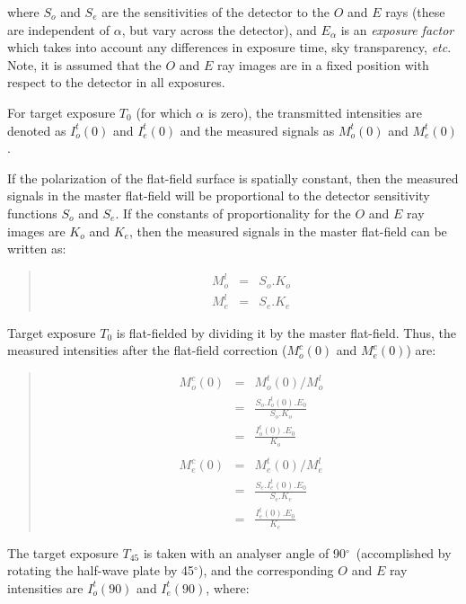 \documentclass[twoside,11pt]{starlink}
\newenvironment{myquote}{\begin{quote}\begin{small}}{\end{small}\end{quote}}
\providecommand{\dgs}{\hbox{$^\circ$}}
\begin{document}
where $S_{o}$ and $S_{e}$ are the sensitivities of the detector to the $O$
and $E$ rays (these are independent of $\alpha$, but vary across the
detector), and $E_{\alpha}$ is an \emph{exposure factor} which takes into
account any differences in exposure time, sky transparency, \emph{etc}. Note, it
is assumed that the $O$ and $E$ ray images are in a fixed position
with respect to the detector in all exposures.

For target exposure $T_{0}$ (for which $\alpha$ is zero), the transmitted
intensities are denoted as $I^{t}_{o}(0)$ and $I^{t}_{e}(0)$ and the
measured signals as $M^{t}_{o}(0)$ and $M^{t}_{e}(0)$.

If the polarization of the flat-field surface is spatially constant, then
the measured signals in the master flat-field will be proportional to
the detector sensitivity functions $S_{o}$ and $S_{e}$. If the constants
of proportionality for the $O$ and $E$ ray images are $K_{o}$ and
$K_{e}$, then the measured signals in the master flat-field can be
written as:

\begin{myquote}
\begin{eqnarray*}
  M^l_{o} & = & S_{o}.K_{o} \\
  M^l_{e} & = & S_{e}.K_{e}
\end{eqnarray*}
\end{myquote}

Target exposure $T_{0}$ is flat-fielded by dividing it by the master
flat-field. Thus, the measured intensities after the flat-field correction
($M^{c}_{o}(0)$ and $M^{c}_{e}(0)$) are:

\begin{myquote}
\begin{eqnarray*}
  M^{c}_{o}(0) & = & M^{t}_{o}(0) / M^{l}_{o} \\
                    & = & \frac{ S_{o}.I^{t}_{o}(0).E_{0} }{ S_{o}.K_{o} } \\
                    & = & \frac{ I^{t}_{o}(0).E_{0} }{ K_{o} } \\ \\
  M^{c}_{e}(0) & = & M^{t}_{e}(0) / M^{l}_{e} \\
                    & = & \frac{ S_{e}.I^{t}_{e}(0).E_{0} }{ S_{e}.K_{e} } \\
                    & = & \frac{ I^{t}_{e}(0).E_{0} }{ K_{e} }
\end{eqnarray*}
\end{myquote}

The target exposure $T_{45}$ is taken with an analyser angle of 90\dgs\
(accomplished by rotating the half-wave plate by 45\dgs), and the
corresponding $O$ and $E$ ray intensities are $I^{t}_{o}(90)$ and
$I^{t}_{e}(90)$, where:
\end{document}
